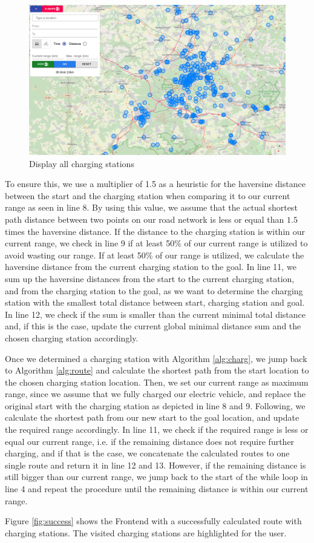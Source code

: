 \documentclass[a4paper]{article}
\begin{document}
\begin{figure}[h]
	\centering
	\includegraphics[scale=0.23]{figures/wide}
	\caption{Display all charging stations}
	\label{fig:charging}
\end{figure}
To ensure this, we use a multiplier of 1.5 as a heuristic for the haversine distance between the start and the charging station when comparing it to our current range as seen in line 8.
By using this value, we assume that the actual shortest path distance between two points on our road network is less or equal than $1.5$ times the haversine distance.
If the distance to the charging station is within our current range, we check in line 9 if at least 50\% of our current range is utilized to avoid wasting our range.
If at least 50\% of our range is utilized, we calculate the haversine distance from the current charging station to the goal.
In line 11, we sum up the haversine distances from the start to the current charging station, and from the charging station to the goal, as we want to determine the charging station with the smallest total distance between start, charging station and goal.
In line 12, we check if the sum is smaller than the current minimal total distance and, if this is the case, update the current global minimal distance sum and the chosen charging station accordingly.\par\medskip
Once we determined a charging station with Algorithm \ref{alg:charg}, we jump back to Algorithm \ref{alg:route} and calculate the shortest path from the start location to the chosen charging station location.
Then, we set our current range as maximum range, since we assume that we fully charged our electric vehicle, and replace the original start with the charging station as depicted in line 8 and 9.
Following, we calculate the shortest path from our new start to the goal location, and update the required range accordingly.
In line 11, we check if the required range is less or equal our current range, i.e. if the remaining distance does not require further charging, and if that is the case, we concatenate the calculated routes to one single route and return it in line 12 and 13.
However, if the remaining distance is still bigger than our current range, we jump back to the start of the while loop in line 4 and repeat the procedure until the remaining distance is within our current range.\par\bigskip
Figure \ref{fig:success} shows the Frontend with a successfully calculated route with charging stations.
The visited charging stations are highlighted for the user. \\
\end{document}

